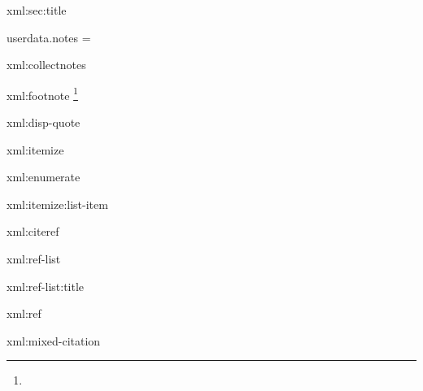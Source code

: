 \startxmlsetups xml:sec:title
\stopxmlsetups


\startluacode
userdata.notes = {}
\stopluacode

\startxmlsetups xml:collectnotes
\stopxmlsetups

\startxmlsetups xml:footnote
\footnote
{\xmlflush
{}}
\stopxmlsetups


\startxmlsetups xml:disp-quote
	\startblockquote
	\stopblockquote
\stopxmlsetups

\startxmlsetups xml:itemize
	\startitemize
	\stopitemize
\stopxmlsetups

\startxmlsetups xml:enumerate
	\startitemize[n]
	\stopitemize
\stopxmlsetups

\startxmlsetups xml:itemize:list-item
	\startitem
	\stopitem
\stopxmlsetups

\startxmlsetups xml:citeref
\stopxmlsetups

\startxmlsetups xml:ref-list
	\startreferencelist
	\startstructurelevel [title=\xmlfilter{#1}{/title/command(xml:ref-list:title)}]
 	\stopstructurelevel
	\stopreferencelist
\stopxmlsetups

\startxmlsetups xml:ref-list:title
\stopxmlsetups

\startxmlsetups xml:ref
	\par
\stopxmlsetups 

\startxmlsetups xml:mixed-citation
\stopxmlsetups 